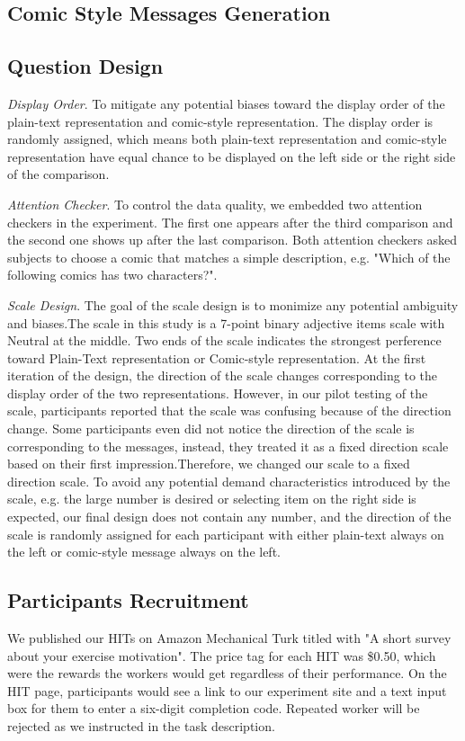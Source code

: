 \subsection{Comic Style Messages Generation}
\subsection{Question Design}
\textit{Display Order}. To mitigate any potential biases toward the display order of the plain-text representation and comic-style representation. The display order is randomly assigned, which means both plain-text representation and comic-style representation have equal chance to be displayed on the left side or the right side of the comparison.\par
\textit{Attention Checker}. To control the data quality, we embedded two attention checkers in the experiment. The first one appears after the third comparison and the second one shows up after the last comparison. Both attention checkers asked subjects to choose a comic that matches a simple description, e.g. "Which of the following comics has two characters?".\par
\textit{Scale Design}. The goal of the scale design is to monimize any potential ambiguity and biases.The scale in this study is a 7-point binary adjective items scale with Neutral at the middle. Two ends of the scale indicates the strongest perference toward Plain-Text representation or Comic-style representation.
At the first iteration of the design, the direction of the scale changes corresponding to the display order of the two representations.
However, in our pilot testing of the scale, participants reported that the scale was confusing because of the direction change. Some participants even did not notice the direction of the scale is corresponding to the messages, instead, they treated it as a fixed direction scale based on their first impression.Therefore, we changed our scale to a fixed direction scale. To avoid any potential demand characteristics introduced by the scale, e.g. the large number is desired or selecting item on the right side is expected, our final design does not contain any number, and the direction of the scale is randomly assigned for each participant with either plain-text always on the left or comic-style message always on the left.\par
\subsection{Participants Recruitment}
We published our HITs on Amazon Mechanical Turk titled with "A short survey about your exercise motivation". The price tag for each HIT was \$0.50, which were the rewards the workers would get regardless of their performance. On the HIT page, participants would see a link to our experiment site and a text input box for them to enter a six-digit completion code. Repeated worker will be rejected as we instructed in the task description.
